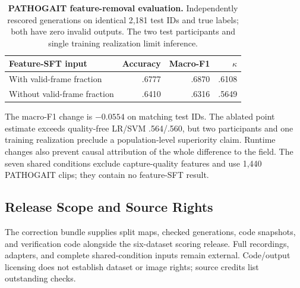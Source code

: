 \begin{table}[H]
\centering\small
\caption{\textbf{PATHOGAIT feature-removal evaluation.} Independently rescored generations on identical 2,181 test IDs and true labels; both have zero invalid outputs. The two test participants and single training realization limit inference.}
\label{tab:supp_novff}
\begin{tabular}{lrrr}\toprule
Feature-SFT input & Accuracy & Macro-F1 & $\kappa$\\\midrule
With valid-frame fraction & .6777 & .6870 & .6108\\
Without valid-frame fraction & .6410 & .6316 & .5649\\\bottomrule
\end{tabular}
\end{table}

The macro-F1 change is $-0.0554$ on matching test IDs. The ablated point estimate exceeds quality-free LR/SVM .564/.560, but two participants and one training realization preclude a population-level superiority claim. Runtime changes also prevent causal attribution of the whole difference to the field. The seven shared conditions exclude capture-quality features and use 1,440 PATHOGAIT clips; they contain no feature-SFT result.

\subsection{Release Scope and Source Rights}
The correction bundle supplies split maps, checked generations, code snapshots, and verification code alongside the six-dataset scoring release. Full recordings, adapters, and complete shared-condition inputs remain external. Code/output licensing does not establish dataset or image rights; source credits list outstanding checks.
